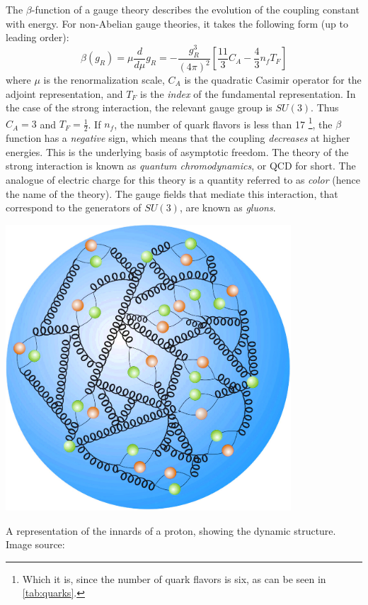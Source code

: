 The $\beta$-function of a gauge theory describes the evolution of the coupling constant with energy. For non-Abelian gauge theories, it takes the following form (up to leading order):
\begin{equation}
  \beta(g_R) = \mu\frac{d}{d\mu}g_R = -\frac{g_R^3}{(4\pi)^2}\left[\frac{11}{3}C_A -\frac{4}{3}n_fT_F\right]
\end{equation}
where $\mu$ is the renormalization scale, $C_A$ is the quadratic Casimir operator for the adjoint representation, and $T_F$ is the \emph{index} of the fundamental representation.
In the case of the strong interaction, the relevant gauge group is $SU(3)$. Thus $C_A = 3$ and $T_F = \frac{1}{2}$. If $n_f$, the number of quark flavors is less than 17 \footnote{Which it is, since the number of quark flavors is six, as can be seen in \autoref{tab:quarks}.}, the $\beta$ function has a \emph{negative} sign, which means that the coupling \emph{decreases} at higher energies. This is the underlying basis of asymptotic freedom. The theory of the strong interaction is known as \emph{quantum chromodynamics}, or QCD for short. The analogue of electric charge for this theory is a quantity referred to as \emph{color} (hence the name of the theory). The gauge fields that mediate this interaction, that correspond to the generators of $SU(3)$, are known as \emph{gluons}. 
\begin{marginfigure}[-15cm]
  \includegraphics[width=0.8\textwidth]{images/proton_innards}
\caption{A representation of the innards of a proton, showing the dynamic structure. Image source:\citep{proton_structure}}
\end{marginfigure}

